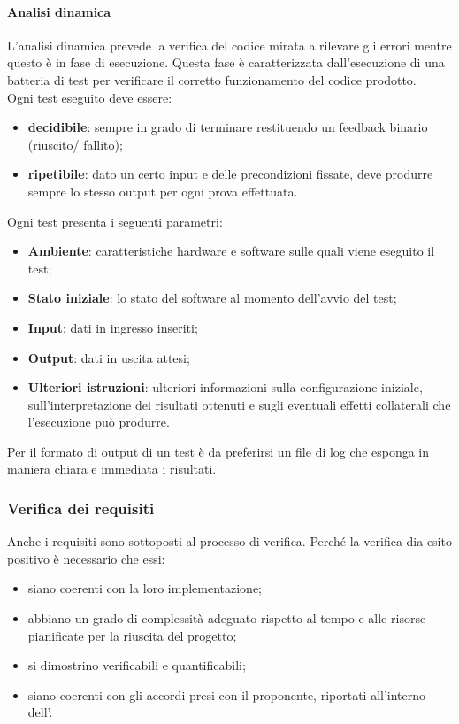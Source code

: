 \paragraph{Analisi dinamica}
L'analisi dinamica prevede la verifica del codice mirata a rilevare gli errori mentre questo è in fase di esecuzione.  Questa fase è caratterizzata dall'esecuzione di una batteria di test per verificare il corretto funzionamento del codice prodotto.\\
Ogni test eseguito deve essere:
\begin{itemize}
    \item \textbf{decidibile}: sempre in grado di terminare restituendo un feedback binario (riuscito/ fallito);
    \item \textbf{ripetibile}: dato un certo input e delle precondizioni fissate, deve produrre sempre lo stesso output per ogni prova effettuata.
\end{itemize}
Ogni test presenta i seguenti parametri:
\begin{itemize}
    \item \textbf{Ambiente}: caratteristiche hardware e software sulle quali viene eseguito il test;
    \item \textbf{Stato iniziale}: lo stato del software al momento dell'avvio del test;
    \item \textbf{Input}: dati in ingresso inseriti;
    \item \textbf{Output}: dati in uscita attesi;
    \item \textbf{Ulteriori istruzioni}: ulteriori informazioni sulla configurazione iniziale, sull'interpretazione dei risultati ottenuti e sugli eventuali effetti collaterali che l'esecuzione può produrre.
\end{itemize}
Per il formato di output di un test è da preferirsi un file di log che esponga in maniera chiara e immediata i risultati.

\subsubsection{Verifica dei requisiti}
Anche i requisiti sono sottoposti al processo di verifica. Perché la verifica dia esito positivo è necessario che essi:

\begin{itemize}
    \item siano coerenti con la loro implementazione;
    \item abbiano un grado di complessità adeguato rispetto al tempo e alle risorse pianificate per la riuscita del progetto;
    \item si dimostrino verificabili e quantificabili;
    \item siano coerenti con gli accordi presi con il proponente, riportati all'interno dell'.
\end{itemize}


